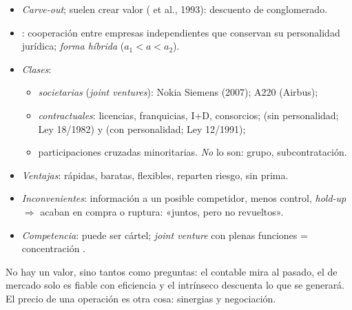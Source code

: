 \documentclass{article}
\begin{document}
\begin{columnas}
\begin{itemize}
\item \emph{Carve-out}; suelen crear valor ( et al., 1993): descuento de conglomerado.
\end{itemize}
\begin{itemize}
\item {}: cooperación entre empresas independientes que conservan su personalidad jurídica; \emph{forma híbrida} ($a_1<a<a_2$).
\item \emph{Clases}:
  \begin{itemize}
  \item \emph{societarias} (\emph{joint ventures}): Nokia Siemens (2007); A220 (Airbus);
  \item \emph{contractuales}: licencias, franquicias, I+D, consorcios;  (sin personalidad; Ley 18/1982) y  (con personalidad; Ley 12/1991);
  \item participaciones cruzadas minoritarias. \emph{No} lo son: grupo, subcontratación.
  \end{itemize}
\item \emph{Ventajas}: rápidas, baratas, flexibles, reparten riesgo, sin prima.
\item \emph{Inconvenientes}: información a un posible competidor, menos control, \emph{hold-up} $\Rightarrow$ acaban en compra o ruptura: «juntos, pero no revueltos».
\item \emph{Competencia}: puede ser cártel; \emph{joint venture} con plenas funciones = concentración .
\end{itemize}

\begin{ideaclave}
No hay un valor, sino tantos como preguntas: el contable mira al pasado, el de mercado solo es fiable con eficiencia y el intrínseco descuenta lo que se generará. El precio de una operación es otra cosa: sinergias y negociación.
\end{ideaclave}


\end{columnas}
\end{document}
